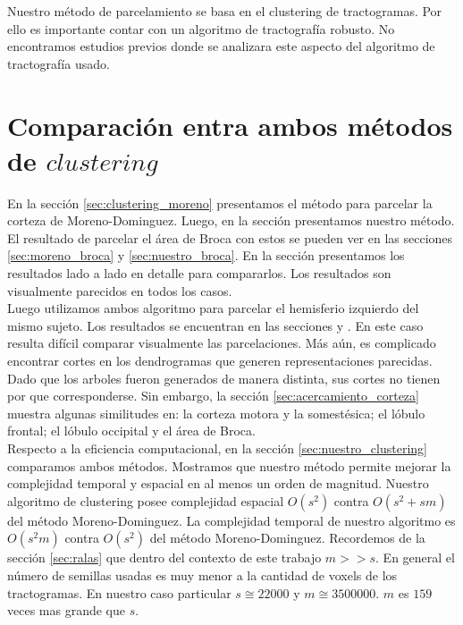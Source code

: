 Nuestro m\'etodo de parcelamiento se basa en el clustering de 
tractogramas. Por ello es importante contar con un algoritmo de 
tractograf\'ia robusto. No encontramos estudios previos donde se analizara
este aspecto del algoritmo de tractograf\'ia usado. \\


\section{Comparaci\'on entra ambos m\'etodos de $clustering$}

En la secci\'on \ref{sec:clustering_moreno} presentamos el m\'etodo para
parcelar la corteza de Moreno-Dominguez. Luego, en la secci\'on
\label{ch:nuestro} presentamos nuestro m\'etodo. El resultado de parcelar
el \'area de Broca con estos se pueden ver en las secciones 
\ref{sec:moreno_broca} y \ref{sec:nuestro_broca}. En la secci\'on 
\label{sec:acercamiento} presentamos los resultados lado a lado en detalle
para compararlos. Los resultados son visualmente parecidos en todos los
casos. \\

Luego utilizamos ambos algoritmo para parcelar el hemisferio izquierdo del
mismo sujeto. Los resultados se encuentran en las secciones 
\label{sec:corteza_moreno} y \label{sec:corteza_nuestro}. En este caso 
resulta dif\'icil comparar visualmente las parcelaciones. M\'as a\'un, es
complicado encontrar cortes en los dendrogramas que generen
representaciones parecidas. Dado que los arboles fueron generados
de manera distinta, sus cortes no tienen por que corresponderse. Sin
embargo, la secci\'on \ref{sec:acercamiento_corteza} muestra algunas
similitudes en: la corteza motora y la somest\'esica; el l\'obulo frontal;
el l\'obulo occipital y el \'area de Broca. \\

Respecto a la eficiencia computacional, en la secci\'on 
\ref{sec:nuestro_clustering} comparamos ambos m\'etodos. 
Mostramos que nuestro m\'etodo permite mejorar la complejidad temporal y
espacial en al menos un orden de magnitud. Nuestro algoritmo de clustering
posee complejidad espacial $O(s^2)$ contra $O(s^2 + sm)$ del m\'etodo
Moreno-Dominguez. La complejidad temporal de nuestro algoritmo es $O(s^2m)$
contra $O(s^2)$ del m\'etodo Moreno-Dominguez. Recordemos de la secci\'on
\ref{sec:ralas} que dentro del contexto de este trabajo $m >> s$. En
general el n\'umero de semillas usadas es muy menor a la cantidad de
voxels de los tractogramas. En nuestro caso particular $s \cong 22000$ y
$m \cong 3500000$. $m$ es $159$ veces mas grande que $s$. \\


